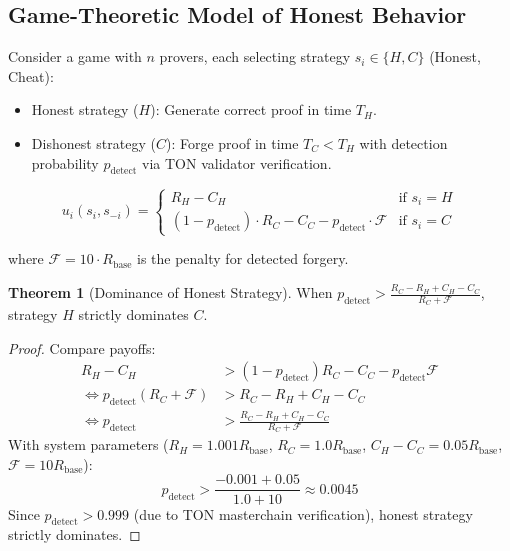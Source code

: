 \documentclass[12pt,a4paper]{article}
\theoremstyle{definition}
\newtheorem{theorem}{Theorem}[section]
\theoremstyle{remark}
\begin{document}
\subsection{Game-Theoretic Model of Honest Behavior}

Consider a game with $n$ provers, each selecting strategy $s_i \in \{H, C\}$ (Honest, Cheat):
\begin{itemize}[nosep]
    \item Honest strategy ($H$): Generate correct proof in time $T_H$.
    \item Dishonest strategy ($C$): Forge proof in time $T_C < T_H$ with detection probability $p_{\text{detect}}$ via TON validator verification.
\end{itemize}

\begin{equation}
u_i(s_i, s_{-i}) = \begin{cases}
R_H - C_H & \text{if } s_i = H \\
(1 - p_{\text{detect}}) \cdot R_C - C_C - p_{\text{detect}} \cdot \mathcal{F} & \text{if } s_i = C
\end{cases}
\end{equation}

where $\mathcal{F} = 10 \cdot R_{\text{base}}$ is the penalty for detected forgery.

\begin{theorem}[Dominance of Honest Strategy]
\label{thm:honest-dominance}
When $p_{\text{detect}} > \frac{R_C - R_H + C_H - C_C}{R_C + \mathcal{F}}$, strategy $H$ strictly dominates $C$.
\end{theorem}

\begin{proof}
Compare payoffs:
\begin{align}
R_H - C_H &> (1 - p_{\text{detect}}) R_C - C_C - p_{\text{detect}} \mathcal{F} \\
\iff p_{\text{detect}}(R_C + \mathcal{F}) &> R_C - R_H + C_H - C_C \\
\iff p_{\text{detect}} &> \frac{R_C - R_H + C_H - C_C}{R_C + \mathcal{F}}
\end{align}
With system parameters ($R_H = 1.001 R_{\text{base}}$, $R_C = 1.0 R_{\text{base}}$, $C_H - C_C = 0.05 R_{\text{base}}$, $\mathcal{F} = 10 R_{\text{base}}$):
\begin{equation}
p_{\text{detect}} > \frac{-0.001 + 0.05}{1.0 + 10} \approx 0.0045
\end{equation}
Since $p_{\text{detect}} > 0.999$ (due to TON masterchain verification), honest strategy strictly dominates.
\end{proof}
\end{document}
